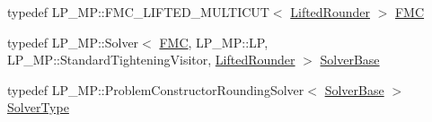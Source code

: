\begin{DoxyCompactItemize}
\item 
typedef L\+P\+\_\+\+M\+P\+::\+F\+M\+C\+\_\+\+L\+I\+F\+T\+E\+D\+\_\+\+M\+U\+L\+T\+I\+C\+U\+T$<$ \hyperlink{structnifty_1_1graph_1_1lifted__multicut_1_1LiftedMulticutMp_1_1LiftedRounder}{Lifted\+Rounder} $>$ \hyperlink{classnifty_1_1graph_1_1lifted__multicut_1_1LiftedMulticutMp_a66bb20962d2d51acdfa1ba2e12156b61}{F\+M\+C}
\item 
typedef L\+P\+\_\+\+M\+P\+::\+Solver$<$ \hyperlink{classnifty_1_1graph_1_1lifted__multicut_1_1LiftedMulticutMp_a66bb20962d2d51acdfa1ba2e12156b61}{F\+M\+C}, L\+P\+\_\+\+M\+P\+::\+L\+P, L\+P\+\_\+\+M\+P\+::\+Standard\+Tightening\+Visitor, \hyperlink{structnifty_1_1graph_1_1lifted__multicut_1_1LiftedMulticutMp_1_1LiftedRounder}{Lifted\+Rounder} $>$ \hyperlink{classnifty_1_1graph_1_1lifted__multicut_1_1LiftedMulticutMp_af9810af21796143a4ae499e061e5f80c}{Solver\+Base}
\item 
typedef L\+P\+\_\+\+M\+P\+::\+Problem\+Constructor\+Rounding\+Solver$<$ \hyperlink{classnifty_1_1graph_1_1lifted__multicut_1_1LiftedMulticutMp_af9810af21796143a4ae499e061e5f80c}{Solver\+Base} $>$ \hyperlink{classnifty_1_1graph_1_1lifted__multicut_1_1LiftedMulticutMp_a74937c2d33c809a39472710855ae7d8a}{Solver\+Type}
\end{DoxyCompactItemize}
